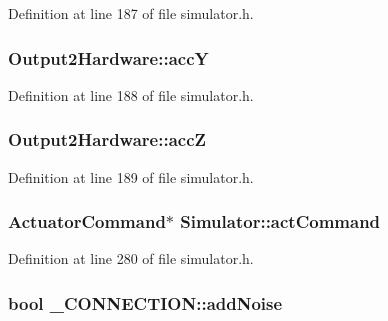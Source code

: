 Definition at line 187 of file simulator.\-h.

\hypertarget{group___h_i_t_l_plugin_ga3ce16295c4d5bfc0a4938f0120d946c4}{
\subsubsection[{acc\-Y}]{ Output2\-Hardware\-::acc\-Y}}\label{group___h_i_t_l_plugin_ga3ce16295c4d5bfc0a4938f0120d946c4}


Definition at line 188 of file simulator.\-h.

\hypertarget{group___h_i_t_l_plugin_ga8565b780814dd8fddf28e4018256356a}{
\subsubsection[{acc\-Z}]{ Output2\-Hardware\-::acc\-Z}}\label{group___h_i_t_l_plugin_ga8565b780814dd8fddf28e4018256356a}


Definition at line 189 of file simulator.\-h.

\hypertarget{group___h_i_t_l_plugin_ga9362d7e2619934460d6f8070496d336f}{
\subsubsection[{act\-Command}]{\setlength{\rightskip}{0pt plus 5cm}Actuator\-Command$\ast$ Simulator\-::act\-Command\hspace{0.3cm}{\ttfamily [protected]}}}\label{group___h_i_t_l_plugin_ga9362d7e2619934460d6f8070496d336f}


Definition at line 280 of file simulator.\-h.

\hypertarget{group___h_i_t_l_plugin_ga0d3c230504eb051a77593129ea6cd79f}{
\subsubsection[{add\-Noise}]{\setlength{\rightskip}{0pt plus 5cm}bool \-\_\-\-C\-O\-N\-N\-E\-C\-T\-I\-O\-N\-::add\-Noise}}\label{group___h_i_t_l_plugin_ga0d3c230504eb051a77593129ea6cd79f}


